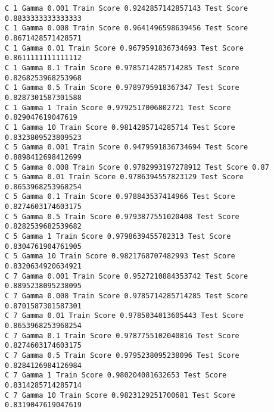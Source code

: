 \documentclass[11pt]{article}
\begin{document}
    \begin{Verbatim}[commandchars=\\\{\}]
C 1 Gamma 0.001 Train Score 0.9242857142857143 Test Score 0.8833333333333333
C 1 Gamma 0.008 Train Score 0.9641496598639456 Test Score 0.8671428571428571
C 1 Gamma 0.01 Train Score 0.9679591836734693 Test Score 0.8611111111111112
C 1 Gamma 0.1 Train Score 0.9785714285714285 Test Score 0.8268253968253968
C 1 Gamma 0.5 Train Score 0.9789795918367347 Test Score 0.8287301587301588
C 1 Gamma 1 Train Score 0.9792517006802721 Test Score 0.829047619047619
C 1 Gamma 10 Train Score 0.9814285714285714 Test Score 0.8323809523809523
C 5 Gamma 0.001 Train Score 0.9479591836734694 Test Score 0.8898412698412699
C 5 Gamma 0.008 Train Score 0.9782993197278912 Test Score 0.87
C 5 Gamma 0.01 Train Score 0.9786394557823129 Test Score 0.8653968253968254
C 5 Gamma 0.1 Train Score 0.978843537414966 Test Score 0.8274603174603175
C 5 Gamma 0.5 Train Score 0.9793877551020408 Test Score 0.8282539682539682
C 5 Gamma 1 Train Score 0.9798639455782313 Test Score 0.8304761904761905
C 5 Gamma 10 Train Score 0.9821768707482993 Test Score 0.8320634920634921
C 7 Gamma 0.001 Train Score 0.9527210884353742 Test Score 0.8895238095238095
C 7 Gamma 0.008 Train Score 0.9785714285714285 Test Score 0.8701587301587301
C 7 Gamma 0.01 Train Score 0.9785034013605443 Test Score 0.8653968253968254
C 7 Gamma 0.1 Train Score 0.9787755102040816 Test Score 0.8274603174603175
C 7 Gamma 0.5 Train Score 0.9795238095238096 Test Score 0.8284126984126984
C 7 Gamma 1 Train Score 0.980204081632653 Test Score 0.8314285714285714
C 7 Gamma 10 Train Score 0.9823129251700681 Test Score 0.8319047619047619

    \end{Verbatim}
\end{document}
